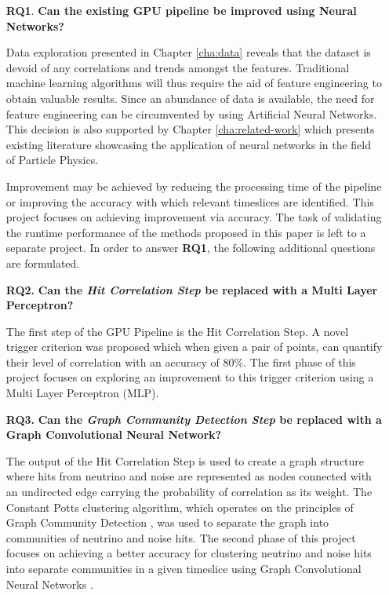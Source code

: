 \begin{enumerate}
  \item[\textbf{RQ1}.] \textbf{Can the existing GPU pipeline be improved using Neural Networks?}

    Data exploration presented in Chapter \ref{cha:data} reveals that
    the dataset is devoid of any correlations and trends amongst the
    features. Traditional machine learning algorithms will thus
    require the aid of feature engineering to obtain valuable results.
    Since an abundance of data is available, the need for feature
    engineering can be circumvented by using Artificial Neural
    Networks. This decision is also supported by Chapter
    \ref{cha:related-work} which presents existing literature
    showcasing the application of neural networks in the field of
    Particle Physics.

    Improvement may be achieved by reducing the processing time of the
    pipeline or improving the accuracy with which relevant timeslices
    are identified. This project focuses on achieving improvement via
    accuracy. The task of validating the runtime performance of the
    methods proposed in this paper is left to a separate project. In
    order to answer \textbf{RQ1}, the following additional questions
    are formulated.

  \item[\textbf{RQ2.}] \textbf{Can the \emph{Hit Correlation Step} be replaced with a Multi Layer Perceptron?}

    The first step of the GPU Pipeline is the Hit Correlation Step. A
    novel trigger criterion was proposed which when given a pair of
    points, can quantify their level of correlation with an accuracy
    of 80\%. The first phase of this project focuses on exploring an
    improvement to this trigger criterion using a Multi Layer
    Perceptron (MLP).
    
  \item[\textbf{RQ3.}] \textbf{Can the \emph{Graph Community Detection Step} be replaced with a Graph Convolutional Neural Network?}

    The output of the Hit Correlation Step is used to create a graph
    structure where hits from neutrino and noise are represented as
    nodes connected with an undirected edge carrying the probability
    of correlation as its weight. The Constant Potts clustering
    algorithm, which operates on the principles of Graph Community
    Detection \cite{fortunato2010community}, was used to separate the
    graph into communities of neutrino and noise hits. The second
    phase of this project focuses on achieving a better accuracy for
    clustering neutrino and noise hits into separate communities in a
    given timeslice using Graph Convolutional Neural Networks
    \cite{kipf2016semi}.
\end{enumerate}


